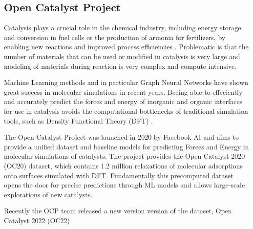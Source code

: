 \subsection{Open Catalyst Project}

Catalysis plays a crucial role in the chemical industry, including energy storage and conversion in 
fuel cells or the production of armonia for fertilizers, by enabling new reactions and improved 
process efficiencies \cite{Chanussot_2021}. Problematic is that the number of materials that can 
be used or modified in catalysis is very large and modeling of materials during reaction is very 
complex and compute intensive.

Machine Learning methods and in particular Graph Neural Networks have shown great success in 
molecular simulations in recent years. Beeing able to effeciently and accurately predict the 
forces and energy of inorganic and organic interfaces for use in catalysis avoids the 
computational bottlenecks of traditional simulation tools, such as Density Functional Theory 
(DFT) \cite{doi:10.1021/ed5004788}. 

The Open Catalyst Project \cite*{Chanussot_2021} was launched in 2020 by Facebook AI and 
aims to provide a unified dataset and baseline models for predicting Forces and Energy in molecular 
simulations of catalysts. The project provides the Open Catalyst 2020 (OC20) dataset, which contains 
1.2 million relaxations of molecular adsorptions onto surfaces simulated with DFT. Fundamentally this 
precomputed dataset opens the door for precise predictions through ML models and allows large-scale 
explorations of new catalysts.

Recently the OCP team released a new version version of the dataset, Open Catalyst 2022 (OC22) 
\cite{https://doi.org/10.48550/arxiv.2206.08917}